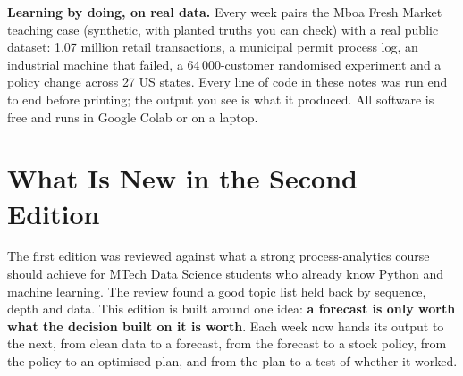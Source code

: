 \begin{titlepage}
\vfill
\begin{plainnote}
\textbf{Learning by doing, on real data.} Every week pairs the Mboa Fresh Market teaching case (synthetic, with
planted truths you can check) with a real public dataset: 1.07 million retail transactions, a municipal permit
process log, an industrial machine that failed, a 64\,000-customer randomised experiment and a policy change
across 27 US states. Every line of code in these notes was run end to end before printing; the output you see
is what it produced. All software is free and runs in Google Colab or on a laptop.
\end{plainnote}
\end{titlepage}

\tableofcontents
\clearpage
{}

\chapter*{What Is New in the Second Edition}

The first edition was reviewed against what a strong process-analytics course should achieve for MTech Data
Science students who already know Python and machine learning. The review found a good topic list held back by
sequence, depth and data. This edition is built around one idea: \textbf{a forecast is only worth what the decision
built on it is worth}. Each week now hands its output to the next, from clean data to a forecast, from the forecast
to a stock policy, from the policy to an optimised plan, and from the plan to a test of whether it worked.

